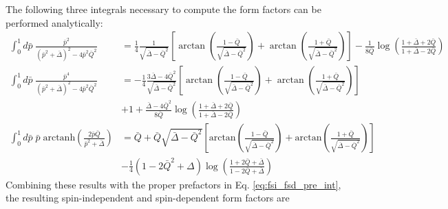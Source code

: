 \documentclass{book}[12pt]
\begin{document}
The following three integrals necessary to compute the form factors can be performed analytically:
\begin{equation}
\begin{split}
\int_0^1 d\bar{p}\;\frac{\bar{p}^2}{(\bar{p}^2+\bar{\Delta})^2-4\bar{p}^2\bar{Q}^2}&=\frac{1}{4}\frac{1}{\sqrt{\bar{\Delta}-\bar{Q}^2}}\left[\arctan\left(\frac{1-\bar{Q}}{\sqrt{\bar{\Delta}-\bar{Q}^2}}\right)+\arctan\left(\frac{1+\bar{Q}}{\sqrt{\bar{\Delta}-\bar{Q}^2}}\right)\right]-\frac{1}{8\bar{Q}}\log\left(\frac{1+\bar{\Delta}+2\bar{Q}}{1+\bar{\Delta}-2\bar{Q}}\right)\\
\int_0^1 d\bar{p}\;\frac{\bar{p}^4}{(\bar{p}^2+\bar{\Delta})^2-4\bar{p}^2\bar{Q}^2}&=-\frac{1}{4}\frac{3\bar{\Delta}-4\bar{Q}^2}{\sqrt{\bar{\Delta}-\bar{Q}^2}}\left[\arctan\left(\frac{1-\bar{Q}}{\sqrt{\bar{\Delta}-\bar{Q}^2}}\right)+\arctan\left(\frac{1+\bar{Q}}{\sqrt{\bar{\Delta}-\bar{Q}^2}}\right)\right]\\
&+1+\frac{\bar{\Delta}-4\bar{Q}^2}{8\bar{Q}}\log\left(\frac{1+\bar{\Delta}+2\bar{Q}}{1+\bar{\Delta}-2\bar{Q}}\right)\\
\int_0^1d\bar{p}\;\bar{p}\;\mathrm{arctanh}\left(\frac{2\bar{p}\bar{Q}}{\bar{p}^2+\bar{\Delta}}\right)&=\bar{Q}+\bar{Q}\sqrt{\bar{\Delta}-\bar{Q}^2}\left[\mathrm{arctan}\left(\frac{1-\bar{Q}}{\sqrt{\bar{\Delta}-\bar{Q}^2}}\right)+\mathrm{arctan}\left(\frac{1+\bar{Q}}{\sqrt{\bar{\Delta}-\bar{Q}^2}}\right)\right]\\
&-\frac{1}{4}\left(1-2\bar{Q}^2+\Delta\right)\log\left(\frac{1+2\bar{Q}+\bar{\Delta}}{1-2\bar{Q}+\bar{\Delta}}\right)
\end{split}
\end{equation}
Combining these results with the proper prefactors in Eq. \ref{eq:fsi_fsd_pre_int}, the resulting spin-independent and spin-dependent form factors are 
\end{document}
